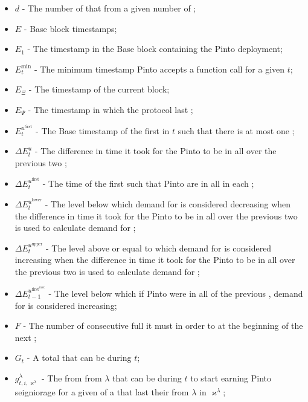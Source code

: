 \documentclass[class=article, crop=false]{standalone}
\begin{document}
\begin{itemize}[topsep=0pt, itemsep=3pt,leftmargin=16pt]
    \item[] $d$ - The number of  that  from a given number of  \Pinto;
    \item[] $E$ - Base block timestamps;
    \item[] $E_{1}$ - The timestamp in the Base block containing the Pinto deployment;
    \item[] $E_{t}^{\text{min}}$ - The minimum timestamp Pinto accepts a  function call for a given $t$;
    \item[] $E_{\Xi}$ - The timestamp of the current block;
    \item[] $E_\Psi$ - The timestamp in which the protocol last ;
    \item[] $E_{t}^{u^{\text{first}}}$ - The Base timestamp of the first  in $t$ such that there is at most one ;
    \item[] $\Delta E_{t}^{u}$ - The difference in time it took for the Pinto to be  in all  over the previous two ;
    \item[] $\Delta E_{t}^{u^{\text{first}}}$ - The time of the first  such that Pinto are  in all  in each ;
    \item[] $\Delta E_{t}^{u^{\text{lower}}}$ - The level below which demand for  is considered decreasing when the difference in time it took for the Pinto to be  in all  over the previous two  is used to calculate demand for ;
    \item[] $\Delta E_{t}^{u^{\text{upper}}}$ - The level above or equal to which demand for  is considered increasing when the difference in time it took for the Pinto to be  in all  over the previous two  is used to calculate demand for ;
    \item[] $\Delta E_{t-1}^{u^{\text{first}^{\text{max}}}}$ - The level below which if Pinto were  in all  of the previous , demand for  is considered increasing;
    \item[] $F$ - The number of consecutive full  it must  in order to  at the beginning of the next ;
    \item[] $G_{t}$ - A  total  that can be  during $t$;
    \item[] $g_{t,i,\varkappa^{\lambda}}^{\lambda}$ - The  from  from $\lambda$  that can be  during $t$ to start earning Pinto seigniorage for a given  of a  that last  their  from $\lambda$  in $\varkappa^{\lambda}$;

\end{itemize}
\end{document}
